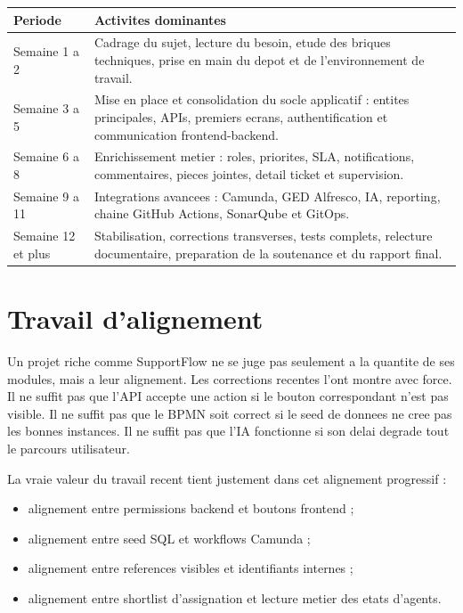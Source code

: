 \begin{longtable}{>{\raggedright\arraybackslash}p{3cm} >{\raggedright\arraybackslash}p{10.5cm}}
\toprule
Periode & Activites dominantes \\
\midrule
Semaine 1 a 2 & Cadrage du sujet, lecture du besoin, etude des briques techniques, prise en main du depot et de l'environnement de travail. \\
Semaine 3 a 5 & Mise en place et consolidation du socle applicatif : entites principales, APIs, premiers ecrans, authentification et communication frontend-backend. \\
Semaine 6 a 8 & Enrichissement metier : roles, priorites, SLA, notifications, commentaires, pieces jointes, detail ticket et supervision. \\
Semaine 9 a 11 & Integrations avancees : Camunda, GED Alfresco, IA, reporting, chaine GitHub Actions, SonarQube et GitOps. \\
Semaine 12 et plus & Stabilisation, corrections transverses, tests complets, relecture documentaire, preparation de la soutenance et du rapport final. \\
\bottomrule
\end{longtable}

\section{Travail d'alignement}

Un projet riche comme SupportFlow ne se juge pas seulement a la quantite de ses modules, mais a leur alignement. Les corrections recentes l'ont montre avec force. Il ne suffit pas que l'API accepte une action si le bouton correspondant n'est pas visible. Il ne suffit pas que le BPMN soit correct si le seed de donnees ne cree pas les bonnes instances. Il ne suffit pas que l'IA fonctionne si son delai degrade tout le parcours utilisateur.

La vraie valeur du travail recent tient justement dans cet alignement progressif :

\begin{itemize}[leftmargin=1.2cm]
  \item alignement entre permissions backend et boutons frontend ;
  \item alignement entre seed SQL et workflows Camunda ;
  \item alignement entre references visibles et identifiants internes ;
  \item alignement entre shortlist d'assignation et lecture metier des etats d'agents.
\end{itemize}

